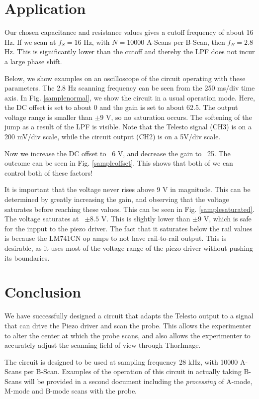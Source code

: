 \documentclass{article}
\begin{document}
\section{Application}
\par{Our chosen capacitance and resistance values gives a cutoff frequency of about 16 Hz. If we scan at $f_S=16$ Hz, with $N=10000$ A-Scans per B-Scan, then $f_B=2.8$ Hz. This is significantly lower than the cutoff and thereby the LPF does not incur a large phase shift.}
\par{Below, we show examples on an oscilloscope of the circuit operating with these parameters. The 2.8 Hz scanning frequency can be seen from the 250 ms/div time axis. In Fig. \ref{samplenormal}, we show the circuit in a usual operation mode. Here, the DC offset is set to about 0 and the gain is set to about 62.5. The output voltage range is smaller than $\pm9$ V, so no saturation occurs. The softening of the jump as a result of the LPF is visible. Note that the Telesto signal (CH3) is on a 200 mV/div scale, while the circuit output (CH2) is on a 5V/div scale.}


\par{Now we increase the DC offset to ~6 V, and decrease the gain to ~25. The outcome can be seen in Fig. \ref{sampleoffset}. This shows that both of we can control both of these factors!}

\par{It is important that the voltage never rises above 9 V in magnitude. This can be determined by greatly increasing the gain, and observing that the voltage saturates before reaching these values. This can be seen in Fig. \ref{samplesaturated}. The voltage saturates at ~$\pm 8.5$ V. This is slightly lower than $\pm9$ V, which is safe for the inpput to the piezo driver. The fact that it saturates below the rail values is because the LM741CN op amps to not have rail-to-rail output. This is desirable, as it uses most of the voltage range of the piezo driver without pushing its boundaries.}

\section{Conclusion}
\par{We have successfully designed a circuit that adapts the Telesto output to a signal that can drive the Piezo driver and scan the probe. This allows the experimenter to alter the center at which the probe scans, and also allows the experimenter to accurately adjust the scanning field of view through ThorImage.}
\par{The circuit is designed to be used at sampling frequency 28 kHz, with 10000 A-Scans per B-Scan. Examples of the operation of this circuit in actually taking B-Scans will be provided in a second document including the \textit{processing} of A-mode, M-mode and B-mode scans with the probe.}
\end{document}
